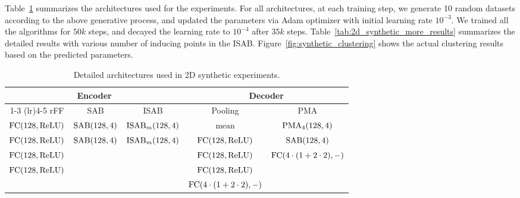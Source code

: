 \documentclass{article}
\begin{document}
Table~\ref{tab:2d_synthetic_architecture} summarizes the architectures used for the experiments. For all architectures, at each training step, we generate 10 random datasets according to the above generative process, and updated the parameters via Adam optimizer  with initial learning rate $10^{-3}$. We trained all the algorithms for $50k$ steps, and decayed the learning rate to $10^{-4}$ after $35k$ steps. Table~\ref{tab:2d_synthetic_more_results} summarizes the detailed results with various number of inducing points in the ISAB.
Figure~\ref{fig:synthetic_clustering} shows the actual clustering results based on the predicted parameters.

\begin{table}[h]
\small
\centering
\caption{Detailed architectures used in 2D synthetic experiments.}
\vspace{5pt}
\begin{tabular}{@{}ccccc@{}}\toprule
\multicolumn{3}{c}{Encoder} & \multicolumn{2}{c}{Decoder}\\
\cmidrule(lr){1-3} \cmidrule(lr){4-5}
rFF & SAB & ISAB & Pooling & PMA \\
\midrule
$\mathrm{FC}(128,\mathrm{ReLU})$ & $\mathrm{SAB}(128,4)$ & $\mathrm{ISAB}_m(128,4)$ & $\mathrm{mean}$ & $\mathrm{PMA}_4(128,4)$\\
$\mathrm{FC}(128,\mathrm{ReLU})$ & $\mathrm{SAB}(128,4)$ & $\mathrm{ISAB}_m(128,4)$ & $\mathrm{FC}(128,\mathrm{ReLU})$ & $\mathrm{SAB}(128,4)$\\
$\mathrm{FC}(128,\mathrm{ReLU})$ & & & $\mathrm{FC}(128,\mathrm{ReLU})$ & $\mathrm{FC}(4\cdot(1+2\cdot 2),-)$ \\
$\mathrm{FC}(128,\mathrm{ReLU})$& & & $\mathrm{FC}(128,\mathrm{ReLU})$ & \\
& & & $\mathrm{FC}(4\cdot(1+2\cdot 2),-)$ & \\
\bottomrule
\end{tabular}
\label{tab:2d_synthetic_architecture}
\end{table}
\end{document}
